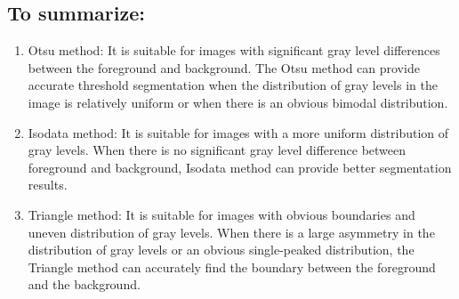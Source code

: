 \documentclass[11pt]{report}
\begin{document}
    \subsection*{To summarize:}

        \begin{enumerate}
            \item Otsu method:
            It is suitable for images with significant gray level differences between the foreground and background. The Otsu method can provide accurate threshold segmentation when the distribution of gray levels in the image is relatively uniform or when there is an obvious bimodal distribution.

            \item Isodata method:
            It is suitable for images with a more uniform distribution of gray levels. When there is no significant gray level difference between foreground and background, Isodata method can provide better segmentation results.

            \item Triangle method:
            It is suitable for images with obvious boundaries and uneven distribution of gray levels. When there is a large asymmetry in the distribution of gray levels or an obvious single-peaked distribution, the Triangle method can accurately find the boundary between the foreground and the background.

        \end{enumerate}

    \renewcommand{\arraystretch}{1.2}
\end{document}
